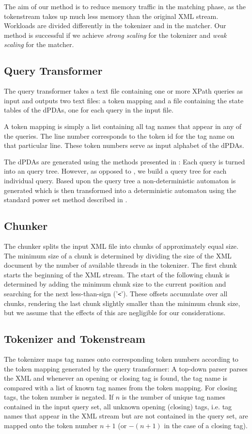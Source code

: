 The aim of our method is to reduce memory traffic in the matching phase, as the
tokenstream takes up much less memory than the original XML stream. Workloads 
are divided differently in the tokenizer and in the matcher. Our method is
successful if we achieve \emph{strong scaling} for the tokenizer and \emph{weak
scaling} for the matcher.

\subsection{Query Transformer}

The query transformer takes a text file containing one or more XPath queries as input 
and outputs two text files: a token mapping and a file containing the state tables of
the dPDAs, one for each query in the input file.

A token mapping is simply a list containing all tag names that appear in any of
the queries. The line number corresponds to the token id for the tag
name on that particular line. These token numbers serve as input alphabet of
the dPDAs.

The dPDAs are generated using the methods presented in \cite{Green2004}: Each
query is turned into an query tree. However, as opposed to
\cite{Green2004}, we build a query tree for each individual query.
Based upon the query tree a non-deterministic automaton is generated which is
then transformed into a deterministic automaton using the standard power set
method described in \cite{Hopcroft2006}.

\subsection{Chunker}
The chunker splits the input XML file into chunks of approximately equal size.
The minimum size of a chunk is determined by dividing the size of the XML
document by the number of available threads in the tokenizer. The first chunk
starts the beginning of the XML stream. The start of the following chunk is
determined by adding the minimum chunk size to the current position and
searching for the next less-than-sign ('\texttt{<}'). These offsets accumulate
over all chunks, rendering the last chunk slightly smaller than the minimum 
chunk size, but we assume that the effects of this are negligible for our considerations.

\subsection{Tokenizer and Tokenstream}
The tokenizer maps tag names onto corresponding token numbers according to the
token mapping generated by the query transformer: A top-down parser parses the
XML and whenever an opening or closing tag is found, the tag name is compared
with a list of known tag names from the token mapping. For closing tags, the
token number is negated. If $n$ is the number of unique tag names contained in
the input query set, all unknown opening (closing) tags, i.e. tag names that appear
in the XML stream but are not contained in the query set, are mapped onto the token
number $n+1$ (or $-(n+1)$ in the case of a closing tag).

